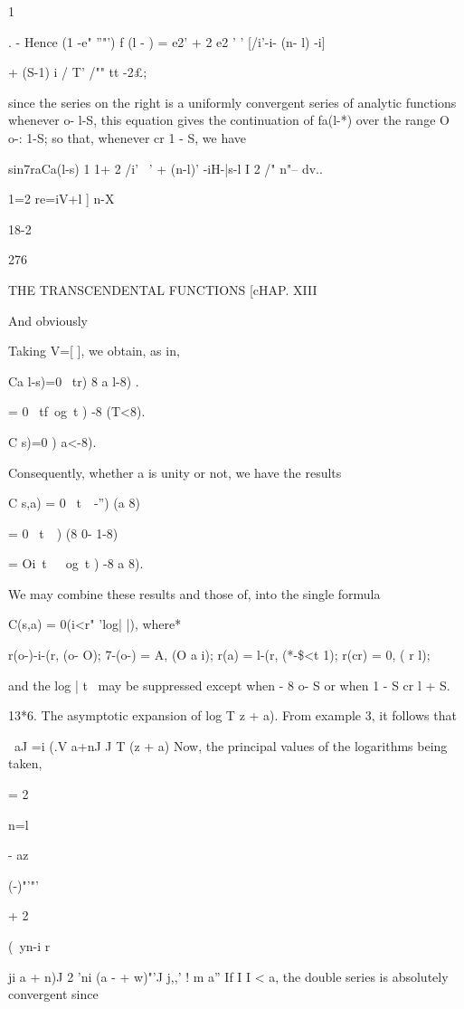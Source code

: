 {{1 %

. - Hence (1 -e" ''"') f (l - ) = e2' + 2 e2 ' ' [/i'-i- (n- l) -i]

+ (S-1) i / T' /"" tt -2£;

since the series on the right is a uniformly convergent series of
analytic functions whenever o- l-S, this equation gives the
continuation of fa(l-*) over the range O o-: 1-S; so that, whenever cr
1 - S, we have

sin7raCa(l-s) 1 1+ 2 /i' ~' + (n-l)' -iH-|s-l I 2 /" n"-- dv..

1=2 re=iV+l ] n-X

18-2

276

THE TRANSCENDENTAL FUNCTIONS [cHAP. XIII

And obviously

Taking V=[ ], we obtain, as in,

Ca l-s)=0 \ tr) 8 a l-8) .

= 0 \ tf\ og\ t ) -8 (T<8).

C s)=0 ) a<-8).

Consequently, whether a is unity or not, we have the results

C s,a) = 0 \ t\ \ -'') (a 8)

= 0 \ t\ \ ) (8 0- 1-8)

= Oi\ t\ \ \ og\ t ) -8 a 8).

We may combine these results and those of, into the single
formula

C(s,a) = 0(i<r" 'log| |), where*

r(o-)-i-(r, (o- O); 7-(o-) = A, (O a i); r(a) = l-(r, (*-\$<t 1);
r(cr) = 0, ( r l);

and the log | t \ may be suppressed except when - 8 o- S or when 1 - S
cr l + S.

13*6. The asymptotic expansion of log T z + a). From example 3,
it follows that

\ aJ =i (.V a+nJ J T (z + a) Now, the principal values of the
logarithms being taken,

= 2

n=l

- az

  (-)"'"'

+ 2

(\ yn-i r

ji a + n)J 2 'ni (a - + w)"'J j,,' ! m a'' If I I < a, the double
series is absolutely convergent since

}}
